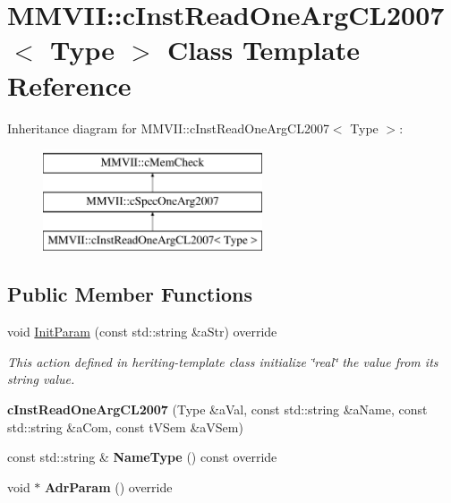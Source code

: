 \hypertarget{classMMVII_1_1cInstReadOneArgCL2007}{}\section{M\+M\+V\+II\+:\+:c\+Inst\+Read\+One\+Arg\+C\+L2007$<$ Type $>$ Class Template Reference}
\label{classMMVII_1_1cInstReadOneArgCL2007}
Inheritance diagram for M\+M\+V\+II\+:\+:c\+Inst\+Read\+One\+Arg\+C\+L2007$<$ Type $>$\+:\begin{figure}[H]
\begin{center}
\leavevmode
\includegraphics[height=3.000000cm]{classMMVII_1_1cInstReadOneArgCL2007}
\end{center}
\end{figure}
\subsection*{Public Member Functions}
\begin{DoxyCompactItemize}
\item 
void \hyperlink{classMMVII_1_1cInstReadOneArgCL2007_af8f23d6b88c080a0c6089edc286f46f6}{Init\+Param} (const std\+::string \&a\+Str) override\hypertarget{classMMVII_1_1cInstReadOneArgCL2007_af8f23d6b88c080a0c6089edc286f46f6}{}\label{classMMVII_1_1cInstReadOneArgCL2007_af8f23d6b88c080a0c6089edc286f46f6}

\begin{DoxyCompactList}\small\item\em This action defined in heriting-\/template class initialize \char`\"{}real\char`\"{} the value from its string value. \end{DoxyCompactList}\item 
{\bfseries c\+Inst\+Read\+One\+Arg\+C\+L2007} (Type \&a\+Val, const std\+::string \&a\+Name, const std\+::string \&a\+Com, const t\+V\+Sem \&a\+V\+Sem)\hypertarget{classMMVII_1_1cInstReadOneArgCL2007_aea59e237f11269fcd15ad81aedb8fb35}{}\label{classMMVII_1_1cInstReadOneArgCL2007_aea59e237f11269fcd15ad81aedb8fb35}

\item 
const std\+::string \& {\bfseries Name\+Type} () const override\hypertarget{classMMVII_1_1cInstReadOneArgCL2007_ad7d596bfa02a571ae2b5f3930ba909c6}{}\label{classMMVII_1_1cInstReadOneArgCL2007_ad7d596bfa02a571ae2b5f3930ba909c6}

\item 
void $\ast$ {\bfseries Adr\+Param} () override\hypertarget{classMMVII_1_1cInstReadOneArgCL2007_a206b9cfab98580baeb7d5bb5533ba496}{}\label{classMMVII_1_1cInstReadOneArgCL2007_a206b9cfab98580baeb7d5bb5533ba496}

\end{DoxyCompactItemize}
